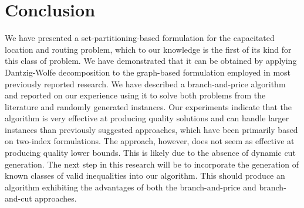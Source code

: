 \section{Conclusion}
\label{sec:Conc}
We have presented a set-partitioning-based formulation for the
capacitated location and routing problem, which to our knowledge is
the first of its kind for this class of problem. We have demonstrated
that it can be obtained by applying Dantzig-Wolfe decomposition to the
graph-based formulation employed in most previously reported research.
We have described a branch-and-price algorithm and reported on our
experience using it to solve both problems from the literature and
randomly generated instances. Our experiments indicate that the
algorithm is very effective at producing quality solutions and can
handle larger instances than previously suggested approaches, which
have been primarily based on two-index formulations. The approach, however, does
not seem as effective at producing quality lower bounds. This is
likely due to the absence of dynamic cut generation.
The next step in this research will be to incorporate the generation
of known classes of valid inequalities into our algorithm. This should
produce an algorithm exhibiting the advantages of both the
branch-and-price and branch-and-cut approaches.

